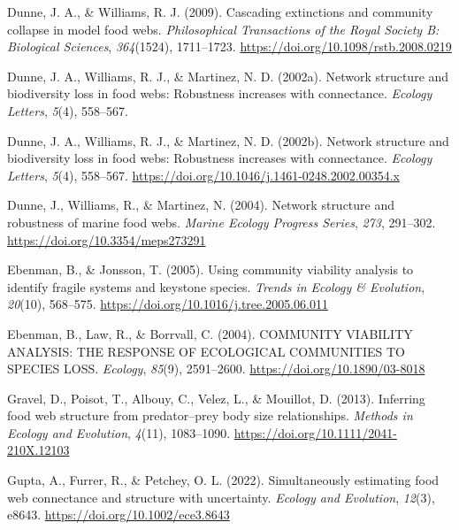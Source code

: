 \documentclass{article}
\newlength{\cslhangindent}
\newlength{\cslentryspacingunit} %
\newenvironment{CSLReferences}[2] %
 {%
  \setlength{\parindent}{0pt}
  \ifodd #1
  \let\oldpar\par
  \def\par{\hangindent=\cslhangindent\oldpar}
  \fi
  \setlength{\parskip}{#2\cslentryspacingunit}
 }%
 {}
\begin{document}
\begin{CSLReferences}{1}{0}
\leavevmode{}%
Dunne, J. A., \& Williams, R. J. (2009). Cascading extinctions and
community collapse in model food webs. \emph{Philosophical Transactions
of the Royal Society B: Biological Sciences}, \emph{364}(1524),
1711--1723. \url{https://doi.org/10.1098/rstb.2008.0219}

\leavevmode{}%
Dunne, J. A., Williams, R. J., \& Martinez, N. D. (2002a). Network
structure and biodiversity loss in food webs: Robustness increases with
connectance. \emph{Ecology Letters}, \emph{5}(4), 558--567.

\leavevmode{}%
Dunne, J. A., Williams, R. J., \& Martinez, N. D. (2002b). Network
structure and biodiversity loss in food webs: Robustness increases with
connectance. \emph{Ecology Letters}, \emph{5}(4), 558--567.
\url{https://doi.org/10.1046/j.1461-0248.2002.00354.x}

\leavevmode{}%
Dunne, J., Williams, R., \& Martinez, N. (2004). Network structure and
robustness of marine food webs. \emph{Marine Ecology Progress Series},
\emph{273}, 291--302. \url{https://doi.org/10.3354/meps273291}

\leavevmode{}%
Ebenman, B., \& Jonsson, T. (2005). Using community viability analysis
to identify fragile systems and keystone species. \emph{Trends in
Ecology \& Evolution}, \emph{20}(10), 568--575.
\url{https://doi.org/10.1016/j.tree.2005.06.011}

\leavevmode{}%
Ebenman, B., Law, R., \& Borrvall, C. (2004). {COMMUNITY VIABILITY
ANALYSIS}: {THE RESPONSE OF ECOLOGICAL COMMUNITIES TO SPECIES LOSS}.
\emph{Ecology}, \emph{85}(9), 2591--2600.
\url{https://doi.org/10.1890/03-8018}

\leavevmode{}%
Gravel, D., Poisot, T., Albouy, C., Velez, L., \& Mouillot, D. (2013).
Inferring food web structure from predator--prey body size
relationships. \emph{Methods in Ecology and Evolution}, \emph{4}(11),
1083--1090. \url{https://doi.org/10.1111/2041-210X.12103}

\leavevmode{}%
Gupta, A., Furrer, R., \& Petchey, O. L. (2022). Simultaneously
estimating food web connectance and structure with uncertainty.
\emph{Ecology and Evolution}, \emph{12}(3), e8643.
\url{https://doi.org/10.1002/ece3.8643}


\end{CSLReferences}
\end{document}
